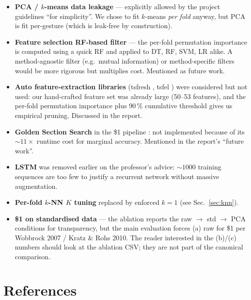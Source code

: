 \documentclass[11pt,a4paper]{article}
\begin{document}
\begin{itemize}[itemsep=0.2em,topsep=0.2em]
\item \textbf{PCA / $k$-means data leakage} --- explicitly allowed by
      the project guidelines ``for simplicity''. We chose to fit
      $k$-means \emph{per fold} anyway, but PCA is fit per-gesture
      (which is leak-free by construction).
\item \textbf{Feature selection RF-based filter} --- the per-fold
      permutation importance is computed using a quick RF and applied
      to DT, RF, SVM, LR alike. A method-agnostic filter (e.g.\ mutual
      information) or method-specific filters would be more rigorous
      but multiplies cost. Mentioned as future work.
\item \textbf{Auto feature-extraction libraries} (tsfresh
      \cite{christ2018tsfresh}, tsfel \cite{barandas2020tsfel}) were
      considered but not used: our hand-crafted feature set was
      already large (50--53 features), and the per-fold permutation
      importance plus 90\,\% cumulative threshold gives us empirical
      pruning. Discussed in the report.
\item \textbf{Golden Section Search} in the \$1 pipeline
      \cite{kratz2010dollar3}: not implemented because of its
      $\sim 11\times$ runtime cost for marginal accuracy. Mentioned
      in the report's ``future work''.
\item \textbf{LSTM} was removed earlier on the professor's advice:
      $\sim 1000$ training sequences are too few to justify a
      recurrent network without massive augmentation.
\item \textbf{Per-fold $k$-NN $K$ tuning} replaced by enforced
      $k=1$ (see Sec.~\ref{sec:knn}).
\item \textbf{\$1 on standardised data} --- the ablation reports the
      raw $\to$ std $\to$ PCA conditions for transparency, but the main
      evaluation forces (a) raw for \$1 per Wobbrock 2007 / Kratz \&
      Rohs 2010. The reader interested in the (b)/(c) numbers should
      look at the ablation CSV; they are not part of the canonical
      comparison.
\end{itemize}

\section*{References}
\renewcommand{\refname}{}
\end{document}
